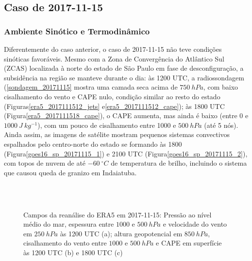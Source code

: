 \subsection{Caso de 2017-11-15}

\subsubsection{Ambiente Sinótico e Termodinâmico}\label{sinotica_20171115}

Diferentemente do caso anterior, o caso de 2017-11-15 não teve condições sinóticas favoráveis. Mesmo com a Zona de Convergência do Atlântico Sul (ZCAS) localizada à norte do estado de São Paulo em fase de desconfiguração, a subsidência na região se manteve durante o dia: às 1200 UTC, a radiossondagem (\autoref{sondagem_20171115} mostra uma camada seca acima de $750\:hPa$, com baixo cisalhamento do vento e CAPE nulo, condição similar ao resto do estado (Figuras\autoref{era5_2017111512_jets} e\autoref{era5_2017111512_cape}); às 1800 UTC (Figura\autoref{era5_2017111518_cape}), o CAPE aumenta, mas ainda é baixo (entre 0 e $1000\:J\:kg^{-1}$), com um pouco de cisalhamento entre 1000 e $500\:hPa$ (até 5 nós). Ainda assim, as imagens de satélite mostram pequenos sistemas convectivos espalhados pelo centro-norte do estado se formando às 1800 (Figura\autoref{goes16_sp_20171115_1}) e 2100 UTC (Figura\autoref{goes16_sp_20171115_2}), com topos de nuvem de até $-60\:^{\circ}C$ de temperatura de brilho, incluindo o sistema que causou queda de granizo em Indaiatuba.

\begin{figure}[hp]
	\begin{center}
		\caption{Campos da reanálise do ERA5 em 2017-11-15: Pressão ao nível médio do mar, espessura entre $1000$ e $500\:hPa$ e velocidade do vento em $250\:hPa$ às 1200 UTC (a); altura geopotencial em $850\:hPa$, cisalhamento do vento entre $1000$ e $500\:hPa$ e CAPE em superfície às 1200 UTC (b) e 1800 UTC (c)} 
		\label{era5_20171115_main}
		 \\
		 \\
	\end{center}
\end{figure}


